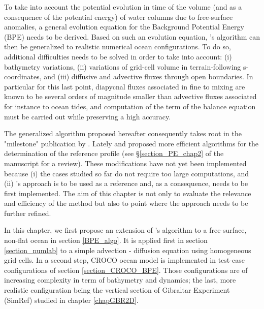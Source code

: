 \color{blue}To take into account the potential evolution in time of the volume (and as a consequence of the potential energy) of water columns due to free-surface anomalies, a general evolution equation for the Background Potential Energy (BPE) needs to be derived.
Based on such an evolution equation, \cite{winters_available_1995}'s algorithm can then be generalized to realistic numerical ocean configurations. To do so, additional difficulties needs to be solved in order to take into account: (i) bathymetry variations, (ii) variations of grid-cell volume in terrain-following s-coordinates, and (iii) diffusive and advective fluxes through open boundaries. In particular for this last point, diapycnal fluxes associated in fine to mixing are known to be several orders of magnitude smaller than advective fluxes associated for instance to ocean tides, and computation of the term of the balance equation must be carried out while preserving a high accuracy.

The generalized algorithm proposed hereafter consequently takes root in the "milestone" publication by \citet{winters_available_1995}. Lately \citet{saenz_estimating_2015} and \citet{tailleux_local_2018} proposed more efficient algorithms for the determination of the reference profile (see \S \ref{section_PE_chap2} of the manuscript for a review). These modifications have not yet been implemented because (i) the cases studied so far do not require too large computations, and (ii) \citet{winters_available_1995}'s approach is to be used as a reference and, as a consequence, needs to be first implemented. The aim of this chapter is not only to evaluate the relevance and efficiency of the method but also to point where the approach needs to be further refined.

In this chapter, we first propose an extension of \cite{winters_available_1995}'s algorithm to a free-surface, non-flat ocean in section \ref{BPE_algo}. It is applied first in section \ref{section_numlab} to a simple advection - diffusion equation using homogeneous grid cells. In a second step, CROCO ocean model is implemented in test-case configurations of section \ref{section_CROCO_BPE}. Those configurations are of increasing complexity in term of bathymetry and dynamics; the last, more realistic configuration being the vertical section of Gibraltar Experiment (SimRef) studied in chapter \ref{chapGBR2D}.

